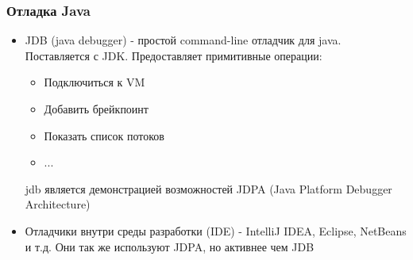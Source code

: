 \begin{frame}
\frametitle{Отладка Java} %
\begin{itemize}
	\item JDB (java debugger) - простой command-line отладчик для java. Поставляется с JDK. Предоставляет примитивные операции:
	\begin{itemize}
		\item Подключиться к VM
		\item Добавить брейкпоинт
		\item Показать список потоков
		\item ...
	\end{itemize}
	jdb является демонстрацией возможностей JDPA (Java Platform Debugger Architecture)
	\item Отладчики внутри среды разработки (IDE) - IntelliJ IDEA, Eclipse, NetBeans и т.д. Они так же 
	используют JDPA, но активнее чем JDB
\end{itemize}
\end{frame}
